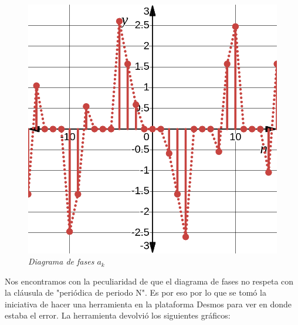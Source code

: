 \documentclass[a4paper,12pt]{report}
\begin{document}
\begin{enumerate}[label=\alph*), left=0pt]
\begin{figure}[H]
\begin{minipage}{0.4\textwidth}
\begin{align*}
        \end{align*}
        \includegraphics[width=1\textwidth]{./images/ej5.4.png}
        \textit{Diagrama de fases $a_k$}
      \end{minipage}
    \end{figure}

    Nos encontramos con la peculiaridad de que el diagrama de fases no respeta con la cláusula de "periódica de periodo N".
    Es por eso por lo que se tomó la iniciativa de hacer una herramienta en la plataforma Desmos para ver en donde estaba el error.
    La herramienta devolvió los siguientes gráficos:


\end{enumerate}
\end{document}
